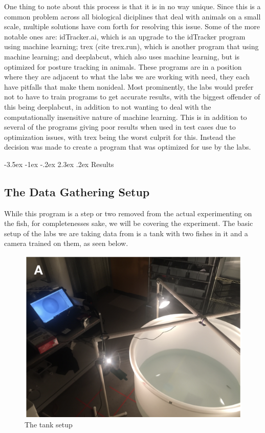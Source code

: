 \documentclass{article}
\makeatletter
\renewcommand\section{\clearpage\newpage\@startsection {section}{1}{\z@}%
	{-3.5ex \@plus -1ex \@minus -.2ex}%
	{2.3ex \@plus.2ex}%
	{\normalfont\Large\bfseries}}
\makeatother
\begin{document}
One thing to note about this process is that it is in no way unique. Since this is a common problem across all biological diciplines that deal with animals on a small scale, multiple solutions have com forth for resolving this issue. Some of the more notable ones are: idTracker.ai, which is an upgrade to the idTracker program using machine learning; trex (cite trex.run), which is another program that using machine learning; and deeplabcut, which also uses machine learning, but is optimized for posture tracking in animals. These programs are in a position where they are adjacent to what the labs we are working with need, they each have pitfalls that make them nonideal. Most prominently, the labs would prefer not to have to train programs to get accurate results, with the biggest offender of this being deeplabcut, in addition to not wanting to deal with the computationally insensitive nature of machine learning. This is in addition to several of the programs giving poor results when used in test cases due to optimization issues, with trex being the worst culprit for this. Instead the decision was made to create a program that was optimized for use by the labs.

\section{Results}

\subsection{The Data Gathering Setup}
While this program is a step or two removed from the actual experimenting on the fish, for completenesses sake, we will be covering the experiment. The basic setup of the labs we are taking data from is a tank with two fishes in it and a camera trained on them, as seen below.

\begin{figure}[H]
	\centering
	\includegraphics[width=.5\linewidth]{experimental_design}
	\caption{The tank setup}
\end{figure}
\end{document}
